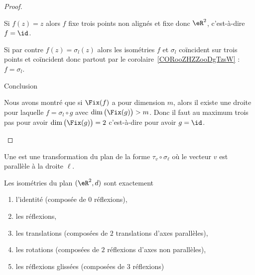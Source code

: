 \begin{proof}
\begin{subproof}
		Si \( f(z)=z\) alors \( f\) fixe trois points non alignés et fixe donc \( \eR^2\), c'est-à-dire \( f=\id\).

		Si par contre \( f(z)=\sigma_l(z)\) alors les isométries \( f\) et \( \sigma_l\) coïncident sur trois points et coïncident donc partout par le corolaire~\ref{CORooZHZZooDgTzsW} : \( f=\sigma_l\).
		\item[Conclusion]

		Nous avons montré que si \( \Fix(f)\) a pour dimension \( m\), alors il existe une droite pour laquelle \( f=\sigma_l\circ g\) avec \( \dim\big( \Fix(g) \big)>m\). Donc il faut au maximum trois pas pour avoir \( \dim\big( \Fix(g) \big)=2\) c'est-à-dire pour avoir \( g=\id\).
	\end{subproof}
\end{proof}

\begin{definition}      \label{DEFooJEOYooNwYtuQ}
	Une  est une transformation du plan de la forme \( \tau_v\circ\sigma_{\ell}\) où le vecteur \( v\) est parallèle à la droite \( \ell\).
\end{definition}

\begin{theorem}      \label{THOooVRNOooAgaVRN}
	Les isométries du plan \( (\eR^2,d)\) sont exactement
	\begin{enumerate}
		\item
		      l'identité (composée de \( 0\) réflexions),
		\item
		      les réflexions,
		\item
		      les translations (composées de \( 2\) translations d'axes parallèles),
		\item
		      les rotations (composées de \( 2\) réflexions d'axes non parallèles),
		\item
		      les réflexions glissées (composées de \( 3\) réflexions)
	\end{enumerate}
\end{theorem}

